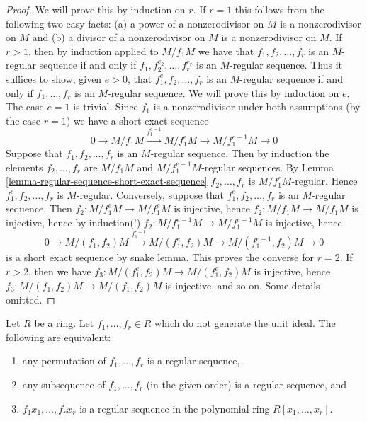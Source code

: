 \begin{proof}
	We will prove this by induction on $r$. If $r = 1$ this follows from the
	following two easy facts: (a) a power of a nonzerodivisor on $M$
	is a nonzerodivisor on $M$ and (b) a divisor of a nonzerodivisor on $M$
	is a nonzerodivisor on $M$.
	If $r > 1$, then by induction applied to $M/f_1M$ we have that
	$f_1, f_2, \ldots, f_r$ is an $M$-regular sequence if and only if
	$f_1, f_2^{e_2}, \ldots, f_r^{e_r}$ is an $M$-regular sequence.
	Thus it suffices to show, given $e > 0$, that $f_1^e, f_2, \ldots, f_r$
	is an $M$-regular sequence if and only if $f_1, \ldots, f_r$
	is an $M$-regular sequence. We will prove this
	by induction on $e$. The case $e = 1$ is trivial. Since $f_1$ is a
	nonzerodivisor under both assumptions (by the case $r = 1$)
	we have a short exact sequence
	$$
	0 \to M/f_1M \xrightarrow{f_1^{e - 1}} M/f_1^eM \to M/f_1^{e - 1}M \to 0
	$$
	Suppose that $f_1, f_2, \ldots, f_r$ is an $M$-regular sequence.
	Then by induction the elements $f_2, \ldots, f_r$ are $M/f_1M$ and
	$M/f_1^{e - 1}M$-regular sequences. By
	Lemma \ref{lemma-regular-sequence-short-exact-sequence}
	$f_2, \ldots, f_r$ is $M/f_1^eM$-regular. Hence $f_1^e, f_2, \ldots, f_r$
	is $M$-regular. Conversely, suppose
	that $f_1^e, f_2, \ldots, f_r$ is an $M$-regular sequence. Then
	$f_2 : M/f_1^eM \to M/f_1^eM$ is injective, hence
	$f_2 : M/f_1M \to M/f_1M$ is injective, hence by induction(!)
	$f_2 : M/f_1^{e - 1}M \to M/f_1^{e - 1}M$ is injective, hence
	$$
	0 \to
	M/(f_1, f_2)M \xrightarrow{f_1^{e - 1}}
	M/(f_1^e, f_2)M \to
	M/(f_1^{e - 1}, f_2)M \to 0
	$$
	is a short exact sequence by snake lemma. This proves the
	converse for $r = 2$. If $r > 2$, then we have
	$f_3 : M/(f_1^e, f_2)M \to M/(f_1^e, f_2)M$ is injective, hence
	$f_3 : M/(f_1, f_2)M \to M/(f_1, f_2)M$ is injective, and so on.
	Some details omitted.
\end{proof}

\begin{lemma}\cite[\href{https://stacks.math.columbia.edu/tag/07DW}{Lemma 07DW}]{stacks-project}
	\label{lemma-regular-sequence-in-polynomial-ring}
	Let $R$ be a ring. Let $f_1, \ldots, f_r \in R$ which do not generate
	the unit ideal. The following are equivalent:
	\begin{enumerate}
		\item any permutation of $f_1, \ldots, f_r$ is a regular sequence,
		\item any subsequence of $f_1, \ldots, f_r$ (in the given order) is
		a regular sequence, and
		\item $f_1x_1, \ldots, f_rx_r$ is a regular sequence in the polynomial
		ring $R[x_1, \ldots, x_r]$.
	\end{enumerate}
\end{lemma}

